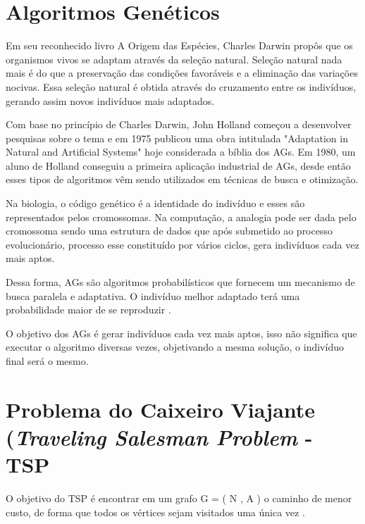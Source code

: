 \documentclass[final,5p,times,twocolumn]{elsarticle}
\begin{document}
	
	
\section {Algoritmos Genéticos}

	Em seu reconhecido livro A Origem das Espécies, Charles Darwin propôs que os organismos vivos se adaptam através 
	da seleção natural. Seleção natural nada mais é do que a preservação das condições favoráveis e a eliminação das 
	variações nocivas. Essa seleção natural é obtida através do cruzamento entre os indivíduos, gerando assim novos
 	indivíduos mais adaptados.

	Com base no princípio de Charles Darwin, John Holland começou a desenvolver pesquisas sobre o tema e em 1975 
	publicou uma obra intitulada "Adaptation in Natural and Artificial Systems" hoje considerada a bíblia dos AGs.
	Em 1980, um aluno de Holland conseguiu a primeira aplicação industrial de AGs, desde então esses tipos de 
	algoritmos vêm sendo utilizados em técnicas de busca e otimização.

	Na biologia, o código genético é a identidade do indivíduo e esses são representados pelos cromossomas. 
	Na computação, a analogia pode ser dada pelo cromossoma sendo uma estrutura de dados que após submetido 
	ao processo evolucionário, processo esse constituído por vários ciclos, gera indivíduos cada vez mais 
	aptos.

	Dessa forma, AGs são algoritmos probabilísticos que fornecem um mecanismo de busca paralela e adaptativa. 
	O indivíduo melhor adaptado terá uma probabilidade maior de se reproduzir \cite{0004-pdf}.

	O objetivo dos AGs é gerar indivíduos cada vez mais aptos, isso não significa que executar o algoritmo 
	diversas vezes, objetivando a mesma solução, o indivíduo final será o mesmo.

\section {Problema do Caixeiro Viajante (\textit{Traveling Salesman Problem} - TSP}
	O objetivo do TSP é encontrar em um grafo G = ( N , A ) o caminho de menor custo, 
	de forma que todos os vértices sejam visitados uma única vez \cite{0006-pdf}.
	
\end{document}
